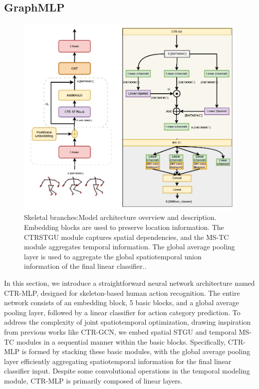\documentclass[conference,a4paper,english]{IEEEtran}[2015/08/26]
\begin{document}
\subsection{GraphMLP}
\begin{figure}
  \centering
  \includegraphics[width=.8\linewidth]{picture/CTR-MLP.png}
  \caption[Simple Figure]{Skeletal branches:Model architecture overview and description. Embedding blocks are used to preserve location information. The CTR\-STGU module captures spatial dependencies, and the MS-TC module aggregates temporal information. The global average pooling layer is used to aggregate the global spatiotemporal union information of the final linear classifier..}
  \label{fig:label}
\end{figure}

In this section, we introduce a straightforward neural network architecture named CTR-MLP, 
designed for skeleton-based human action recognition. The entire network consists of an embedding block, 
5 basic blocks, and a global average pooling layer, followed by a linear classifier for action category 
prediction. To address the complexity of joint spatiotemporal optimization, 
drawing inspiration from previous works like CTR-GCN, we embed spatial STGU and temporal MS-TC modules 
in a sequential manner within the basic blocks. Specifically, CTR-MLP is formed by stacking these basic
 modules, with the global average pooling layer efficiently aggregating spatiotemporal information for 
 the final linear classifier input. Despite some convolutional operations in the temporal modeling module,
 CTR-MLP is primarily composed of linear layers.
\end{document}
